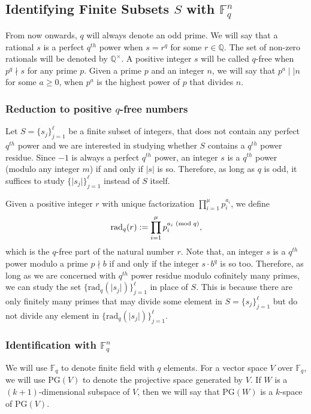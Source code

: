 \documentclass[12pt]{amsart}
\newcommand{\PG}{\mathrm{PG}}
\begin{document}
\subsection{Identifying Finite Subsets $S$ with $\mathbb{F}_{q}^{n}$}
\label{ProjectiveIdentification}
From now onwards, $q$ will always denote an odd prime. We will say that a rational $s$ is a perfect $q^{th}$ power when $s = r^{q}$ for some $r \in\mathbb{Q}$. The set of non-zero rationals will be denoted by $\mathbb{Q}^{\times}$. A positive integer $s$ will be called $q$-free when $p^{q} \nmid s$ for any prime $p$. Given a prime $p$ and an integer $n$, we will say that $p^{a} \mid\mid n$ for some $a \geq 0$, when $p^{a}$ is the highest power of $p$ that divides $n$. 

\subsubsection{Reduction to positive $q$-free numbers}
Let $S = \{s_{j}\}_{j=1}^{\ell}$ be a finite subset of integers, that does not contain any perfect $q^{th}$ power and we are interested in studying whether $S$ contains a $q^{th}$ power residue. Since $-1$ is always a perfect $q^{th}$ power, an integer $s$ is a $q^{th}$ power (modulo any integer $m$) if and only if $|s|$ is so. Therefore, as long as $q$ is odd, it suffices to study $\{\lvert s_{j} \rvert\}_{j=1}^{\ell}$ instead of $S$ itself. 

Given a positive integer $r$ with unique factorization $\prod_{i=1}^{\mu} p_{i}^{a_{i}}$, we define \[ \text{rad}_{q}(r) := \prod_{i=1}^{\mu} p_{i}^{a_{i} \hspace{1mm} (\text{mod } q)}, \] which is the $q$-free part of the natural number $r$. Note that, an integer $s$ is a $q^{th}$ power modulo a prime $p \nmid b$ if and only if the integer $s \cdot b^{q}$ is so too. Therefore, as long as we are concerned with $q^{th}$ power residue modulo cofinitely many primes, we can study the set  $\{\text{rad}_{q}\left(\lvert s_{j} \rvert\right)\}_{j=1}^{\ell}$ in place of $S$. This is because there are only finitely many primes that may divide some element in $S = \{s_{j}\}_{j=1}^{\ell}$ but do not divide any element in $\{\text{rad}_{q}\left(\lvert s_{j} \rvert\right)\}_{j=1}^{\ell}$.

\subsubsection{Identification with $\mathbb{F}_{q}^{n}$} We will use $\mathbb{F}_{q}$ to denote finite field with $q$ elements. For a vector space $V$ over $\mathbb{F}_{q}$, we will use $\PG(V)$ to denote the projective space generated by $V$. If $W$ is a $(k+1)$-dimensional subspace of $V$, then we will say that $\PG(W)$ is a $k$-space of $\PG(V)$. 
\end{document}
